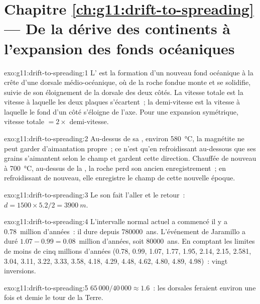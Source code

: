 \section*{Chapitre \ref{ch:g11:drift-to-spreading} --- De la dérive des continents à l'expansion des fonds océaniques}

\begin{solution}{exo:g11:drift-to-spreading:1}
L' est la formation d'un nouveau fond
océanique à la crête d'une dorsale médio-océanique, où de la roche fondue
monte et se solidifie, suivie de son éloignement de la dorsale des deux
côtés. La vitesse totale est la vitesse à laquelle les deux plaques
s'écartent~; la demi-vitesse est la vitesse à laquelle le fond d'un côté
s'éloigne de l'axe. Pour une expansion symétrique, vitesse totale $= 2
\times$ demi-vitesse.
\end{solution}

\begin{solution}{exo:g11:drift-to-spreading:2}
Au-dessus de sa , environ \qty{580}{\celsius}, la
magnétite ne peut garder d'aimantation propre~; ce n'est qu'en refroidissant
au-dessous que ses grains s'aimantent selon le champ et gardent cette
direction. Chauffée de nouveau à \qty{700}{\celsius}, au-dessus de la
, la roche perd son ancien enregistrement~; en
refroidissant de nouveau, elle enregistre le champ de cette nouvelle
époque.
\end{solution}

\begin{solution}{exo:g11:drift-to-spreading:3}
Le son fait l'aller et le retour~: $d = 1500 \times 5.2/2 = \qty{3900}{m}$.
\end{solution}

\begin{solution}{exo:g11:drift-to-spreading:4}
L'intervalle normal actuel a commencé il y a \num{0.78}~million d'années~:
il dure depuis \num{780000}~ans. L'événement de Jaramillo a duré
$1.07 - 0.99 = \num{0.08}$~million d'années, soit \num{80000}~ans. En
comptant les limites de moins de cinq millions d'années (0.78, 0.99, 1.07,
1.77, 1.95, 2.14, 2.15, 2.581, 3.04, 3.11, 3.22, 3.33, 3.58, 4.18, 4.29,
4.48, 4.62, 4.80, 4.89, 4.98)~: vingt inversions.
\end{solution}

\begin{solution}{exo:g11:drift-to-spreading:5}
$65\,000/40\,000 \approx 1.6$~: les dorsales feraient environ une fois et
demie le tour de la Terre.
\end{solution}

